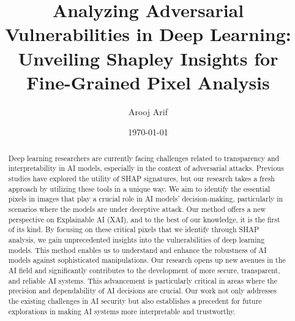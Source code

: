 \documentclass[10pt, conference, a4paper, final]{IEEEtran}
\title{Analyzing Adversarial Vulnerabilities in Deep Learning: Unveiling Shapley Insights for Fine-Grained Pixel Analysis}
\author{Arooj Arif}
\date{\today} %
\begin{document}
\maketitle %


\begin{abstract}
    Deep learning researchers are currently facing challenges related to transparency and interpretability in AI models, especially in the context of adversarial attacks. Previous studies have explored the utility of SHAP signatures, but our research takes a fresh approach by utilizing these tools in a unique way. We aim to identify the essential pixels in images that play a crucial role in AI models' decision-making, particularly in scenarios where the models are under deceptive attack. Our method offers a new perspective on Explainable AI (XAI), and to the best of our knowledge, it is the first of its kind.
    By focusing on these critical pixels that we identify through SHAP analysis, we gain unprecedented insights into the vulnerabilities of deep learning models. This method enables us to understand and enhance the robustness of AI models against sophisticated manipulations. Our research opens up new avenues in the AI field and significantly contributes to the development of more secure, transparent, and reliable AI systems. This advancement is particularly critical in areas where the precision and dependability of AI decisions are crucial. Our work not only addresses the existing challenges in AI security but also establishes a precedent for future explorations in making AI systems more interpretable and trustworthy.
    

\end{abstract}
\end{document}
